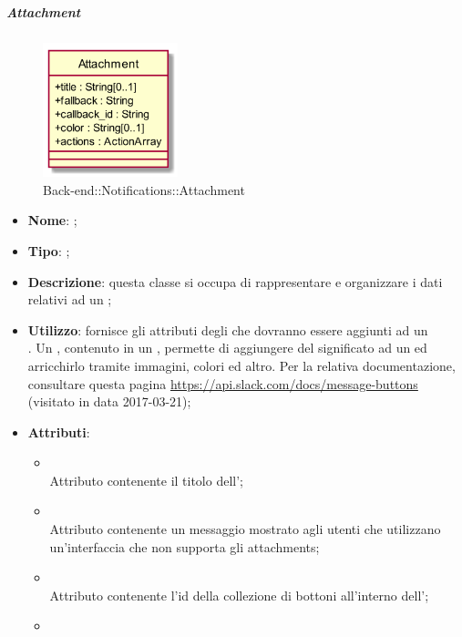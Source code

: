 \hypertarget{Attachment_label}{\subparagraph{Attachment}}
\begin{figure}[h]
	\centering
	\includegraphics[width=0.35\textwidth,height=\textheight,keepaspectratio]{images/ClassAttachment.png}
	\caption{Back-end::Notifications::Attachment}
\end{figure}
\begin{itemize}
	\item \textbf{Nome}: ;
	\item \textbf{Tipo}: ;
	\item \textbf{Descrizione}: questa classe si occupa di rappresentare e organizzare i dati relativi ad un 
	;
	\item \textbf{Utilizzo}: fornisce gli attributi degli  che dovranno essere aggiunti ad un \\ .
	Un , contenuto in un , permette di aggiungere del significato ad un  ed arricchirlo tramite immagini, colori ed altro.
	Per la relativa documentazione, consultare questa pagina \url{https://api.slack.com/docs/message-buttons}  (visitato in data 2017-03-21);
	\item \textbf{Attributi}:
	\begin{itemize}
		\item[]  \\
		Attributo contenente il titolo dell';
		\item[]  \\
		Attributo contenente un messaggio mostrato agli utenti che utilizzano un'interfaccia che non supporta gli attachments;
		\item[]  \\
		Attributo contenente l'id della collezione di bottoni all'interno dell';
		\item[]  \\

\end{itemize}
\end{itemize}

